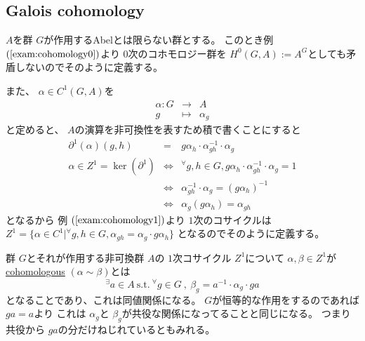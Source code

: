 \documentclass[../master_galois_theory]{subfiles}
\begin{document}
\subsection{Galois cohomology}

\begin{defi}
  $A$を群 $G$が作用する\rm{Abel}とは限らない群とする。
  このとき例 $(\mathrm{\ref{exam:cohomology0}})$より
  $0$次のコホモロジー群を
  $H^0(G,A) := A^G$としても矛盾しないのでそのように定義する。

  また、 $\alpha \in C^1(G,A)$を
  \begin{eqnarray*}
    \alpha : G & \longrightarrow & A \\
    g & \longmapsto & \alpha_g
  \end{eqnarray*}
  と定めると、 $A$の演算を非可換性を表すため積で書くことにすると
  \begin{eqnarray*}
    \partial^1(\alpha)(g , h) & = & g \alpha_h \cdot \alpha_{gh}^{-1} \cdot \alpha_g \\
    \alpha \in Z^1 = \ker(\partial^1) & \Leftrightarrow & {}^\forall g , h \in G , g \alpha_h \cdot \alpha_{gh}^{-1} \cdot \alpha_g = 1 \\
    & \Leftrightarrow & \alpha_{gh}^{-1} \cdot \alpha_g = (g \alpha_h)^{-1} \\
    & \Leftrightarrow & \alpha_g (g \alpha_h) = \alpha_{gh}
  \end{eqnarray*}
  となるから
  例 $(\mathrm{\ref{exam:cohomology1}})$より
  $1$次のコサイクルは
  $Z^1 = \{ \alpha \in C^1 | {}^\forall g , h \in G , \alpha_{gh} = \alpha_g \cdot g \alpha_h \}$
  となるのでそのように定義する。
\end{defi}

\begin{defi}
  群 $G$とそれが作用する非可換群 $A$の
  $1$次コサイクル $Z^1$について
  $\alpha , \beta \in Z^1$が\underline{\rm{cohomologous}} $(\alpha \sim \beta)$とは
  \[
  {}^\exists a \in A \  \mathrm{s.t.} \
  {}^\forall g \in G \  , \  \beta_g = a^{-1} \cdot \alpha_g \cdot ga
  \]
  となることであり、これは同値関係になる。
  $G$が恒等的な作用をするのであれば $ga = a$より
  これは $\alpha_g$と $\beta_g$が共役な関係になってることと同じになる。
  つまり共役から $ga$の分だけねじれているともみれる。
\end{defi}
\end{document}
